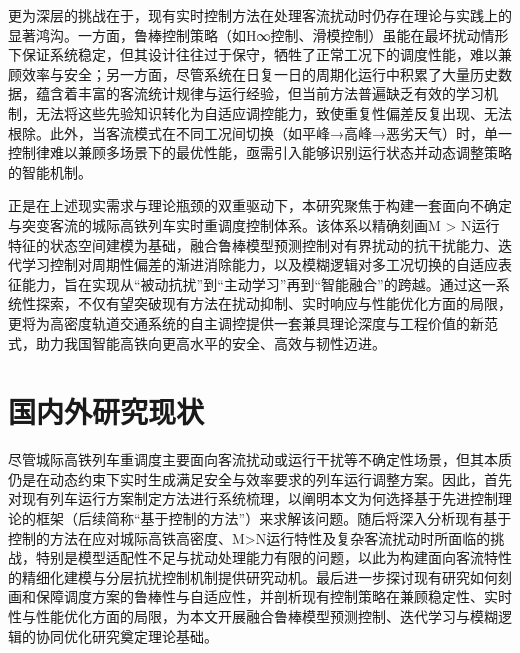 更为深层的挑战在于，现有实时控制方法在处理客流扰动时仍存在理论与实践上的显著鸿沟。一方面，鲁棒控制策略（如H∞控制、滑模控制）\cite{hansen2001robust,calafiore2012robust,weinmann2012uncertain,mhaskar2006robust,mayne2005robust,grimm2007nominally,dorato2003historical}虽能在最坏扰动情形下保证系统稳定，但其设计往往过于保守，牺牲了正常工况下的调度性能，难以兼顾效率与安全；另一方面，尽管系统在日复一日的周期化运行中积累了大量历史数据，蕴含着丰富的客流统计规律与运行经验\cite{li2019short,daamen2004modelling,sun2015integrated,zhang2017real}，但当前方法普遍缺乏有效的学习机制，无法将这些先验知识转化为自适应调控能力，致使重复性偏差反复出现、无法根除。此外，当客流模式在不同工况间切换（如平峰→高峰→恶劣天气）时，单一控制律难以兼顾多场景下的最优性能，亟需引入能够识别运行状态并动态调整策略的智能机制。

正是在上述现实需求与理论瓶颈的双重驱动下，本研究聚焦于构建一套面向不确定与突变客流的城际高铁列车实时重调度控制体系。该体系以精确刻画M > N运行特征的状态空间建模为基础，融合鲁棒模型预测控制对有界扰动的抗干扰能力、迭代学习控制对周期性偏差的渐进消除能力，以及模糊逻辑对多工况切换的自适应表征能力，旨在实现从“被动抗扰”到“主动学习”再到“智能融合”的跨越。通过这一系统性探索，不仅有望突破现有方法在扰动抑制、实时响应与性能优化方面的局限，更将为高密度轨道交通系统的自主调控提供一套兼具理论深度与工程价值的新范式，助力我国智能高铁向更高水平的安全、高效与韧性迈进。           


\section{国内外研究现状}

尽管城际高铁列车重调度主要面向客流扰动或运行干扰等不确定性场景，但其本质仍是在动态约束下实时生成满足安全与效率要求的列车运行调整方案。因此，首先对现有列车运行方案制定方法进行系统梳理，以阐明本文为何选择基于先进控制理论的框架（后续简称“基于控制的方法”）来求解该问题。随后将深入分析现有基于控制的方法在应对城际高铁高密度、M>N运行特性及复杂客流扰动时所面临的挑战，特别是模型适配性不足与扰动处理能力有限的问题，以此为构建面向客流特性的精细化建模与分层抗扰控制机制提供研究动机。最后进一步探讨现有研究如何刻画和保障调度方案的鲁棒性与自适应性，并剖析现有控制策略在兼顾稳定性、实时性与性能优化方面的局限，为本文开展融合鲁棒模型预测控制、迭代学习与模糊逻辑的协同优化研究奠定理论基础。


